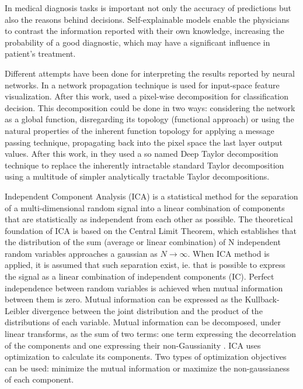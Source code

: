 \documentclass[review]{elsarticle}
\theoremstyle{definition} %
\theoremstyle{remark}
\begin{document}
In medical diagnosis tasks is important not only the accuracy of predictions but also the reasons behind decisions. Self-explainable models enable the physicians to contrast the information reported with their own knowledge, increasing the probability of a good diagnostic, which may have a significant influence in patient's treatment.  

Different attempts have been done for interpreting the results reported by neural networks. In \cite{zeiler2014visualizing} a network propagation technique is used for input-space feature visualization. After this work, \cite{bach2015pixel} used a pixel-wise decomposition for classification decision. This decomposition could be done in two ways: considering the network as a global function, disregarding its topology (functional approach) or using the natural properties of the inherent function topology for applying a message passing technique, propagating back into the pixel space the last layer output values. After this work, in \cite{montavon2017explaining} they used a so named Deep Taylor decomposition technique to replace the inherently intractable standard Taylor decomposition using a multitude of simpler analytically tractable Taylor decompositions.

Independent Component Analysis (ICA)\cite{hyvarinen2000independent} is a statistical method for the separation of a multi-dimensional random signal into a linear combination of components that are statistically as independent from each other as possible. The theoretical foundation of ICA is based on the Central Limit Theorem, which establishes that the distribution of the sum (average or linear combination) of N independent random variables approaches a gaussian as $N \rightarrow \infty$. When ICA method is applied, it is assumed that such separation exist, ie. that is possible to express the signal as a linear combination of independent components (IC). Perfect independence between random variables is achieved when mutual information between them is zero. Mutual information can be expressed as the Kullback-Leibler divergence between the joint distribution and the product of the distributions of each variable. Mutual information can be decomposed, under linear transforms, as the sum of two terms: one term expressing the decorrelation of the components and one expressing their non-Gaussianity \cite{cardoso2003dependence}. ICA uses optimization to calculate its components. Two types of optimization objectives can be used: minimize the mutual information or maximize the non-gaussianess of each component. 
\end{document}

